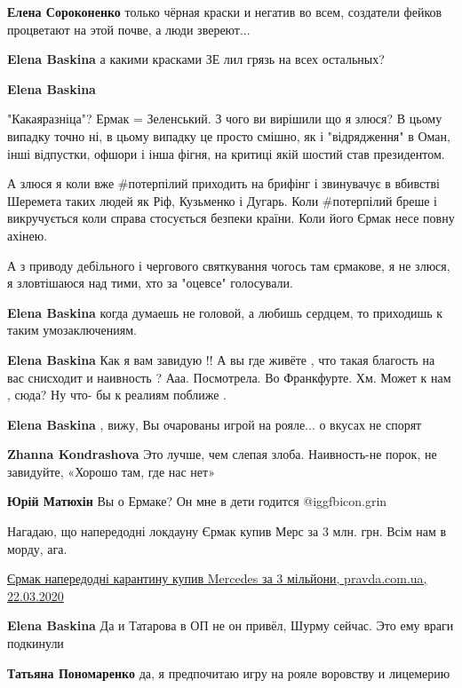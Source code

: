 \begin{itemize}
\begin{itemize}
\textbf{Елена Сороконенко} только чёрная краски и негатив во всем, создатели фейков процветают на этой почве, а люди звереют...

\textbf{Elena Baskina} а какими красками ЗЕ лил грязь на всех остальных?

\textbf{Elena Baskina} 

"Какаяразніца"? Ермак = Зеленський. З чого ви вирішили що я злюся? В цьому
випадку точно ні, в цьому випадку це просто смішно, як і "відрядження" в Оман,
інші відпустки, офшори і інша фігня, на критиці якій шостий став президентом.

А злюся я коли вже \#потерпілий приходить на брифінг і звинувачує в вбивстві
Шеремета таких людей як Ріф, Кузьменко і Дугарь. Коли \#потерпілий бреше і
викручується коли справа стосується безпеки країни. Коли його Єрмак несе повну
ахінею.

А з приводу дебільного і чергового святкування чогось там єрмакове, я не злюся,
я зловтішаюся над тими, хто за "оцевсе" голосували.


\textbf{Elena Baskina} когда думаешь не головой, а любишь сердцем, то приходишь к таким умозаключениям.

\textbf{Elena Baskina} Как я вам завидую !! А вы где живёте , что такая благость на вас снисходит и наивность ? Ааа. Посмотрела. Во Франкфурте. Хм. Может к нам , сюда? Ну что- бы к реалиям поближе .

\textbf{Elena Baskina} , вижу, Вы очарованы игрой на рояле... о вкусах не спорят

\textbf{Zhanna Kondrashova} Это лучше, чем слепая злоба. Наивность-не порок, не завидуйте, «Хорошо там, где нас нет»

\textbf{Юрій Матюхін} Вы о Ермаке? Он мне в дети годится @igg{fbicon.grin} 


Нагадаю, що напередодні локдауну Єрмак купив Мерс за 3 млн. грн. Всім нам в
морду, ага. 

\href{http://www.pravda.com.ua/news/2020/03/22/7244597/}{%
Єрмак напередодні карантину купив Mercedes за 3 мільйони, pravda.com.ua, 22.03.2020%
}

\textbf{Elena Baskina} Да и Татарова в ОП не он привёл, Шурму сейчас. Это ему враги подкинули

\textbf{Татьяна Пономаренко} да, я предпочитаю игру на рояле воровству и лицемерию


\end{itemize}
\end{itemize}
